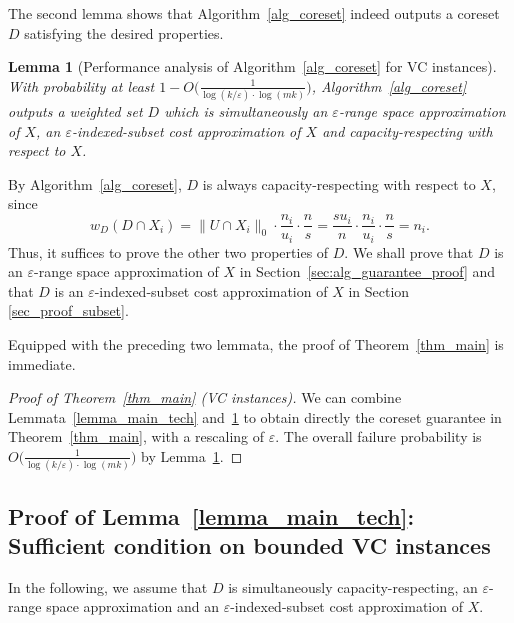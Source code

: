 \documentclass[11pt,letterpaper]{article}
\newtheorem{lemma}[theorem]{Lemma}
\theoremstyle{definition}
\newcommand{\eps}{\varepsilon}
\newcommand{\LH}[1]{\textcolor{blue}{LH: #1}}
\begin{document}
The second lemma shows that Algorithm~\ref{alg_coreset} indeed outputs a coreset $D$ satisfying the desired properties.
%

\begin{lemma}[Performance analysis of Algorithm~\ref{alg_coreset} for VC instances] \label{alg_guarantee}
With probability at least $1-O\big(\frac{1}{\log (k/\eps)\cdot \log (mk)}\big)$,  Algorithm~\ref{alg_coreset} outputs a weighted set $D$ which
is simultaneously an $\eps$-range space approximation of $X$, an $\eps$-indexed-subset cost approximation of $X$ and capacity-respecting with respect to $X$.
\end{lemma}

By Algorithm~\ref{alg_coreset}, $D$ is always capacity-respecting with respect to $X$, since
\[
    w_D(D\cap X_i)=\|U\cap X_i\|_0\cdot \frac{n_i}{u_i}\cdot \frac{n}{s}=\frac{su_i}{n}\cdot \frac{n_i}{u_i}\cdot \frac{n}{s}=n_i.
\]
Thus, it suffices to prove the other two properties of $D$.
%
We shall prove that $D$ is an $\eps$-range space approximation of $X$ in Section~\ref{sec:alg_guarantee_proof} and that $D$ is an $\eps$-indexed-subset cost approximation of $X$ in Section \ref{sec_proof_subset}.
%

Equipped with the preceding two lemmata, the proof of Theorem~\ref{thm_main} is immediate.

\begin{proof}[Proof of Theorem~\ref{thm_main} (VC instances)]
    We can combine Lemmata~\ref{lemma_main_tech} and~\ref{alg_guarantee} to obtain directly the coreset guarantee in Theorem~\ref{thm_main}, with a rescaling of $\eps$. The overall failure probability is $O\big(\frac{1}{\log(k/\eps)\cdot \log (mk)}\big)$ by Lemma~\ref{alg_guarantee}.
\end{proof}


\subsection{Proof of Lemma~\ref{lemma_main_tech}: Sufficient condition on bounded VC instances}\label{sec:lemma_main_tech}

In the following, we assume that $D$ is simultaneously capacity-respecting, an $\eps$-range space approximation and an $\eps$-indexed-subset cost approximation of $X$.
%
\end{document}
